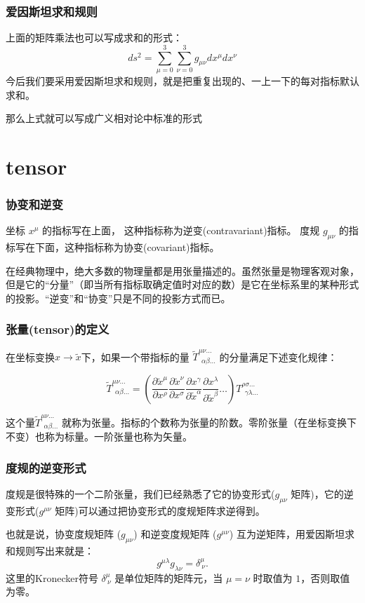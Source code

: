 \documentclass[CJK,13pt]{beamer}
\begin{document}
\begin{frame}
  \frametitle{爱因斯坦求和规则}
  上面的矩阵乘法也可以写成求和的形式：
$$ds^2 = \sum_{\mu=0}^3\sum_{\nu=0}^3 g_{\mu\nu} dx^\mu dx^\nu$$
  今后我们要采用爱因斯坦求和规则，就是把{\blue 重复出现的、一上一下的每对指标默认求和}。

  
  那么上式就可以写成广义相对论中标准的形式

\end{frame}


\section{tensor}


\begin{frame}
  \frametitle{协变和逆变}
  坐标 $x^\mu$ 的指标写在上面， 这种指标称为{\blue 逆变(contravariant)指标}。
  度规 $g_{\mu\nu}$ 的指标写在下面，这种指标称为{\blue 协变(covariant)指标}。


  \skiplines
  
  在经典物理中，绝大多数的物理量都是用张量描述的。虽然张量是物理客观对象，但是它的“分量”（即当所有指标取确定值时对应的数）是它在坐标系里的某种形式的投影。“逆变”和“协变”只是不同的投影方式而已。
\end{frame}

\begin{frame}
\frametitle{ 张量(tensor)的定义 }

在坐标变换$x \rightarrow \tilde{x}$下，如果一个带指标的量 $\tilde{T}^{\mu\nu\ldots}_{\ \ \alpha\beta\ldots}$ 的分量满足下述变化规律：


$$\tilde{T}^{\mu\nu\ldots}_{\ \ \alpha\beta\ldots} = \left(\frac{\partial \tilde{x}^\mu}{\partial x^\rho}\frac{\partial \tilde{x}^\nu}{\partial x^\sigma} \frac{\partial x^\gamma }{\partial \tilde{x}^\alpha}\frac{\partial x^\lambda}{\partial \tilde{x}^\beta} \ldots \right)T^{\rho\sigma\ldots}_{\ \ \gamma\lambda\ldots} $$

这个量$\tilde{T}^{\mu\nu\ldots}_{\ \ \alpha\beta\ldots}$ 就称为张量。指标的个数称为张量的阶数。零阶张量（在坐标变换下不变）也称为标量。一阶张量也称为矢量。

\end{frame}


\begin{frame}
  \frametitle{度规的逆变形式}
  度规是很特殊的一个二阶张量，我们已经熟悉了它的协变形式($g_{\mu\nu}$ 矩阵)，它的{\blue 逆变形式($g^{\mu\nu}$ 矩阵)可以通过把协变形式的度规矩阵求逆得到}。

  \skipline

  也就是说，协变度规矩阵 ($g_{\mu\nu}$) 和逆变度规矩阵 ($g^{\mu\nu}$) 互为逆矩阵，用爱因斯坦求和规则写出来就是：
  $$g^{\mu\lambda}g_{\lambda\nu} = \delta^\mu_{\ \nu}.$$
  这里的Kronecker符号 $\delta^\mu_{\ \nu}$ 是单位矩阵的矩阵元，当 $\mu=\nu$ 时取值为 $1$，否则取值为零。
\end{frame}
\end{document}
